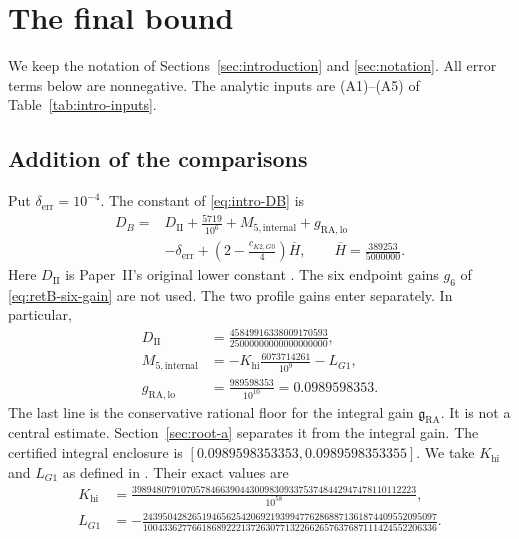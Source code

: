\section{The final bound}\label{sec:final-bill}

We keep the notation of Sections~\ref{sec:introduction} and
\ref{sec:notation}.
All error terms below are nonnegative.
The analytic inputs are \textup{(A1)}--\textup{(A5)} of
Table~\ref{tab:intro-inputs}.

\subsection{Addition of the comparisons}

Put $\delta_{\mathrm{err}}=10^{-4}$.
The constant of \eqref{eq:intro-DB} is
\begin{equation}\label{eq:bill-constant}
\begin{aligned}
 D_B={}&D_{\mathrm{II}}+\frac{5719}{10^6}
       +M_{5,\mathrm{internal}}+g_{\mathrm{RA,lo}}\\
     &-\delta_{\mathrm{err}}+
       \left(2-\frac{c_{K2,G0}}{4}\right)\overline H,
 \qquad \overline H=\frac{389253}{5000000}.
\end{aligned}
\end{equation}
Here $D_{\mathrm{II}}$ is Paper~II's original lower constant
\cite[(6.3a)]{PaperII}.
The six endpoint gains $g_6$ of \eqref{eq:retB-six-gain} are not used.
The two profile gains enter separately.
In particular,
\begin{equation}\label{eq:bill-components}
\begin{aligned}
 D_{\mathrm{II}}&=\frac{45849916338009170593}
                         {25000000000000000000},\\
 M_{5,\mathrm{internal}}
     &=-K_{\mathrm{hi}}\frac{6073714261}{10^9}-L_{G1},\\
 g_{\mathrm{RA,lo}}&=\frac{989598353}{10^{10}}=0.0989598353.
\end{aligned}
\end{equation}
The last line is the conservative rational floor for the integral
gain $\mathfrak g_{\mathrm{RA}}$. It is not a central estimate.
Section~\ref{sec:root-a} separates it from the integral gain.
The certified integral enclosure is
$[0.0989598353353,0.0989598353355]$.
We take $K_{\mathrm{hi}}$ and $L_{G1}$ as defined in
\cite[(A.10d), (4.84)]{PaperII}.
Their exact values are
\begin{equation}\label{eq:bill-M5-inputs}
\begin{aligned}
 K_{\mathrm{hi}}&=
 \frac{3989480791070578466390443009830933753748442947478110112223}
      {10^{58}},\\[2pt]
 L_{G1}&=-
 \frac{243950428265194656254206921939947762868871361874409552095097}
      {100433627766186892221372630771322662657637687111424552206336}.
\end{aligned}
\end{equation}
